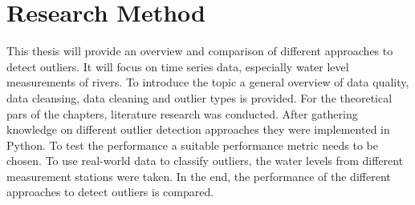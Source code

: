 \section{Research Method}
This thesis will provide an overview and comparison of different approaches to detect outliers. It will focus on time series data, especially water level measurements of rivers. To introduce the topic a general overview of data quality, data cleansing, data cleaning and outlier types is provided. For the theoretical pars of the chapters, literature research was conducted. After gathering knowledge on different outlier detection approaches they were implemented in Python. To test the performance a suitable performance metric needs to be chosen. To use real-world data to classify outliers, the water levels from different measurement stations were taken. In the end, the performance of the different approaches to detect outliers is compared.
